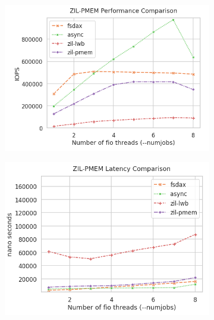 \documentclass[12pt,a4paper,twoside]{book}
\begin{document}
\begin{figure}[H]
    \begin{subfigure}{0.5\textwidth}
        \includegraphics[width=\textwidth]{fig/evaluation/motivating_fio_benchmark__zilpmem__iops}
    \end{subfigure}
    \begin{subfigure}{0.5\textwidth}
        \includegraphics[width=\textwidth]{fig/evaluation/motivating_fio_benchmark__zilpmem__latency}
    \end{subfigure}
    \begin{subfigure}{0.5\textwidth}

\end{subfigure}
\end{figure}
\end{document}
